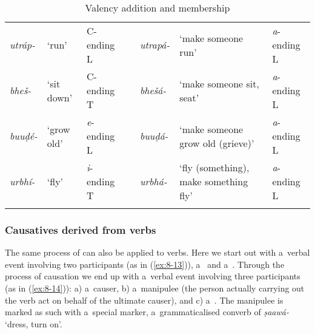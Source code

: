 \begin{table} 
\caption{Valency addition and  membership}
\begin{tabularx}{\textwidth}{ l  P{10mm}  l  l  l  Q  l }
\lsptoprule
\textit{utráp-} &
`run' &
C-ending L &
\centering {\textgreater} &
\textit{utrapá-} &
`make someone run' &
\textit{a}-ending L\\
\textit{bheš-} &
`sit down' &
C-ending T &
\centering {\textgreater} &
\textit{bhešá-} &
`make someone sit, seat' &
\textit{a}-ending L\\
\textit{buuḍé-} &
`grow old' &
\textit{e}-ending L &
\centering {\textgreater}\par
&
\textit{buuḍá-} &
`make someone grow old (grieve)' &
\textit{a}-ending L\\
\textit{urbhí-} &
`fly'
&
{\textit{i}-ending T}
&
\centering {\textgreater}\par
&
\textit{urbhá-}
&
`fly (something), make something fly' &
{\textit{a}-ending L}
\\\lspbottomrule
\end{tabularx}
\label{tab:8-addcl}
\end{table}

\subsubsection*{Causatives derived from  verbs}

The same process of  can also be applied to  verbs. Here we start out with a~verbal event involving two participants (as in (\ref{ex:8-13})), a~ and a~. Through the process of causation we end up with a~verbal event involving three participants (as in (\ref{ex:8-14})): a) a~causer, b) a~manipulee (the person actually carrying out the verb act on behalf of the ultimate causer), and c) a~. The manipulee is marked as such with a~special marker, a~grammaticalised converb of \textit{ṣaawá-} `dress, turn on'. 


